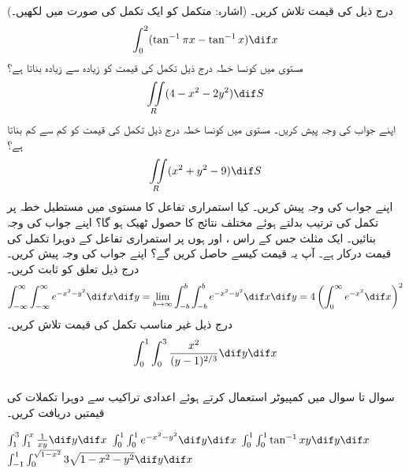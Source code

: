 درج  ذیل کی قیمت تلاش کریں۔ (اشارہ: متکمل کو ایک تکمل کی صورت میں لکھیں۔)
\begin{align*}
\int_0^2 (\tan^{-1}\pi x-\tan^{-1}x)\dif x
\end{align*}
مستوی  میں کونسا خطہ  درج ذیل تکمل کی قیمت کو زیادہ سے زیادہ بناتا ہے؟
\begin{align*}
\iint\limits_R (4-x^2-2y^2)\dif S
\end{align*}
اپنے جواب کی وجہ پیش کریں۔
مستوی  میں کونسا خطہ  درج ذیل تکمل کی قیمت کو کم سے کم  بناتا ہے؟
\begin{align*}
\iint\limits_R (x^2+y^2-9)\dif S
\end{align*}
اپنے جواب کی وجہ پیش کریں۔
کیا استمراری تفاعل  کا مستوی  میں مستطیل خطہ پر  تکمل کی ترتیب بدلتے ہوئے مختلف نتائج کا حصول ٹھیک ہو گا؟ اپنے جواب کی وجہ بنائیں۔
ایک مثلث جس کے راس  ،  اور  ہوں پر استمراری تفاعل  کے  دوہرا  تکمل  کی قیمت درکار ہے۔ آپ یہ قیمت کیسے حاصل کریں گے؟ اپنے جواب کی وجہ پیش کریں۔
درج ذیل تعلق کو ثابت کریں۔
\begin{align*}
\int_{-\infty}^{\infty}\int_{-\infty}^{\infty} e^{-x^2-y^2}\dif x\dif y=\lim_{b\to\infty}\int_{-b}^b\int_{-b}^b e^{-x^2-y^2}\dif x\dif y=4\left(\int_0^{\infty}e^{-x^2}\dif x\right)^2
\end{align*}
درج ذیل غیر مناسب تکمل کی قیمت تلاش کریں۔
\begin{align*}
\int_0^1\int_0^3\frac{x^2}{(y-1)^{2/3}}\dif y\dif x
\end{align*}
\\
سوال  تا سوال  میں کمپیوٹر استعمال کرتے ہوئے اعدادی تراکیب سے دوہرا تکملات کی قیمتیں دریافت کریں۔

$\int_1^3\int_1^x\frac{1}{xy}\dif y\dif x$
$\int_0^1\int_0^1e^{-x^2-y^2}\dif y\dif x$
$\int_0^1\int_0^1\tan^{-1}xy\dif y\dif x$
$\int_{-1}^1\int_0^{\sqrt{1-x^2}}3\sqrt{1-x^2-y^2}\dif y\dif x$


